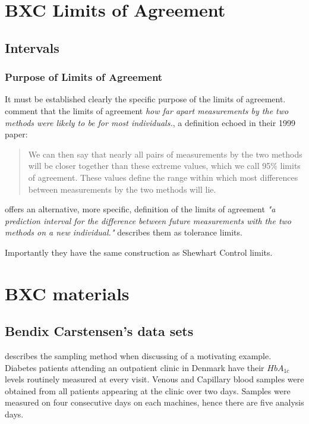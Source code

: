 \documentclass[12pt, a4paper]{report}
\theoremstyle{plain}
\theoremstyle{definition}
\theoremstyle{remark}
\begin{document}
	
	
	\chapter{BXC Limits of Agreement}
	
	
	
	
	\section{Intervals}
	
	\subsection{Purpose of Limits of Agreement} It must be established
	clearly the specific purpose of the limits of agreement.
	\citet*{BA95} comment that the limits of agreement \emph{how far
		apart measurements by the two methods were likely to be for most
		individuals.}, a definition echoed in their 1999 paper:
	\begin{quote} We can then say that nearly all pairs
		of measurements by the two methods will be closer together than
		these extreme values, which we call 95\% limits of agreement.
		These values define the range within which most differences
		between measurements by the two methods will lie\citep{BA99}.
	\end{quote}
	\citet{BXC} offers an alternative, more specific,  definition of
	the limits of agreement \emph{"a prediction interval for the
		difference between future measurements with the two methods on a
		new individual."} \citet{luiz} describes them as tolerance limits.
	
	Importantly they have the same construction as Shewhart Control
	limits.
	
	
	
	\chapter{BXC materials}
	
	
	
	\section{Bendix Carstensen's data sets}
	\citet{BXC2008} describes the sampling method when discussing of a motivating example. Diabetes patients attending an outpatient clinic in Denmark have their $HbA_{1c}$ levels routinely measured at every visit. Venous and Capillary blood samples were obtained from all patients appearing at the clinic over two days. Samples were measured on four consecutive days on each machines, hence there are five analysis days.
	
\end{document}
